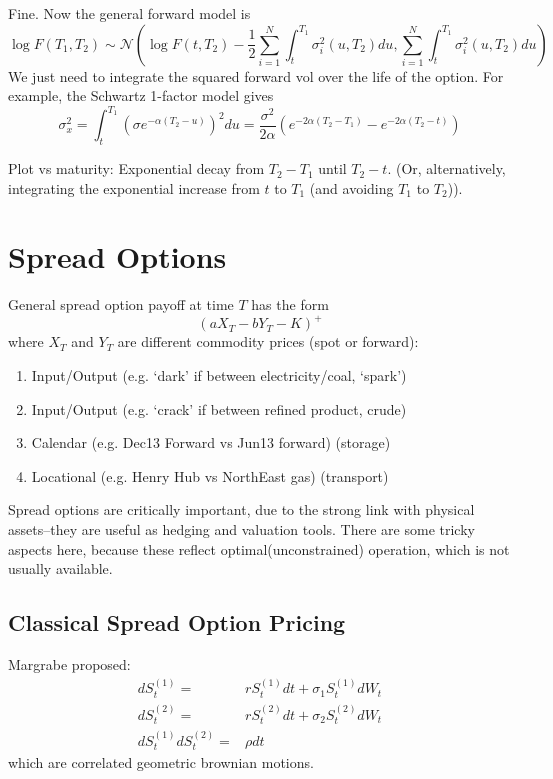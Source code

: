 Fine. Now the general forward model is
\begin{equation}
	\log F(T_1,T_2) \sim \mathcal{N}(
	\log F(t,T_2) - \frac12 \sum_{i=1}^N \int_t^{T_1} \sigma_i^2(u,T_2)du
	,
	\sum_{i=1}^N \int_t^{T_1} \sigma_i^2(u,T_2)du
	)
\end{equation}
We just need to integrate the squared forward vol over the life of the option. For example, the Schwartz 1-factor model gives
\begin{equation}
	\sigma_x^2 = \int_{t}^{T_1} (\sigma e^{-\alpha (T_2-u)})^2du
		   = \frac{\sigma^2}{2\alpha} \left( e^{-2\alpha(T_2-T_1)} - e^{-2\alpha(T_2-t)} \right)
\end{equation}

Plot vs maturity: Exponential decay from $T_2-T_1$ until $T_2-t$. (Or, alternatively, integrating the exponential increase from $t$ to $T_1$ (and avoiding $T_1$ to $T_2$)).

\section{Spread Options}
General spread option payoff at time $T$ has the form
\begin{equation}
	(a X_T - bY_T - K)^+
\end{equation}
where $X_T$ and $Y_T$ are different commodity prices (spot or forward):
\begin{enumerate}
	\item Input/Output (e.g. `dark' if between electricity/coal, `spark')
	\item Input/Output (e.g. `crack' if between refined product, crude)
	\item Calendar (e.g. Dec13 Forward vs Jun13 forward) (storage)
	\item Locational (e.g. Henry Hub vs NorthEast gas) (transport)
\end{enumerate}
Spread options are critically important, due to the strong link with physical assets--they are useful as hedging and valuation tools.
There are some tricky aspects here, because these reflect optimal(unconstrained) operation, which is not usually available.

\subsection{Classical Spread Option Pricing}
Margrabe proposed:
\begin{align}
	dS_t^{(1)} =& rS_t^{(1)}dt + \sigma_1 S_t^{(1)} dW_t\\
	dS_t^{(2)} =& rS_t^{(2)}dt + \sigma_2 S_t^{(2)} dW_t\\
	dS_t^{(1)} dS_t^{(2)} =& \rho dt
\end{align}
which are correlated geometric brownian motions.


